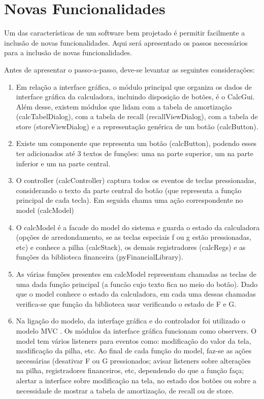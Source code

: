 \chapter{Novas Funcionalidades}

Um das características de um software bem projetado é permitir facilmente a inclusão de novas funcionalidades. 
Aqui será apresentado os passos necessários para a inclusão de novas funcionalidades.

Antes de apresentar o passo-a-passo, deve-se levantar as seguintes considerações:

\begin{enumerate}
 \item Em relação a interface gráfica, o módulo principal que organiza os dados de interface gráfica da calculadora, 
incluindo disposição de botões, é o CalcGui. Além desse, existem módulos que lidam com a tabela de amortização 
(calcTabelDialog), com a tabela de recall (recallViewDialog), com a tabela de store (storeViewDialog) e a 
representação genérica de um botão (calcButton).

\item Existe um componente que representa um botão (calcButton), podendo esses ter adicionados até 3 textos de 
funções: uma na parte superior, um na parte inferior e um na parte central.

\item O controller (calcController) captura todos os eventos de teclas pressionadas, considerando o texto da parte central do botão 
(que representa a função principal de cada tecla). Em seguida chama uma ação correspondente no model (calcModel)

\item O calcModel é a facade do model do sistema e guarda o estado da calculadora (opções de arredondamento, 
se as teclas especiais f ou g estão pressionadas, etc) e conhece a pilha (calcStack), os demais registradores (calcRegs) 
e as funções da biblioteca financeira (pyFinancialLibrary).

\item As várias funções presentes em calcModel representam chamadas as teclas de uma dada função principal 
(a funcão cujo texto fica no meio do botão). Dado que o model conhece o estado da calculadora, em cada uma dessas 
chamadas verifica-se que função da biblioteca usar verificando o estado de F e G.

\item Na ligação do modelo, da interfaçe gráfica e do controlador foi utilizado o modelo MVC \cite {mvc}. 
Os módulos da interface gráfica funcionam como observers. O model tem vários listeners para eventos como: 
modificação do valor da tela, modificação da pilha, etc. Ao final de cada função do model, faz-se as ações necessárias 
(desativar F ou G pressionados; avisar listeners sobre alterações na pilha, registradores financeiros, etc, 
dependendo do que a função faça; alertar a interface sobre modificação na tela, no estado dos botões ou sobre 
a necessidade de mostrar a tabela de amortização, de recall ou de store.


\end{enumerate}
